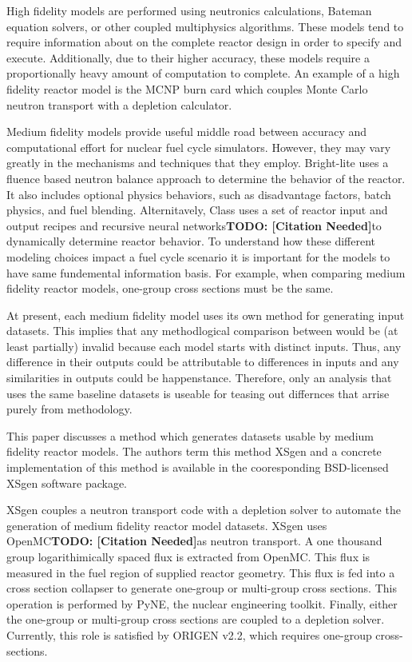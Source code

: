 \documentclass{article}
\newcommand{\TODO}[1] {{\color{red}\textbf{TODO: #1}}}
\newcommand{\citeme}{\TODO{[Citation Needed]}}
\begin{document}
High fidelity models are performed using neutronics calculations, Bateman
equation\cite{Bateman} solvers, or other coupled multiphysics algorithms. These models tend
to require information about on the complete reactor design in order to specify and execute.
Additionally, due to their higher accuracy, these models require a proportionally heavy amount
of computation to complete. An example of a high fidelity reactor model is the
MCNP\cite{mcnp5monte} burn card which couples Monte Carlo neutron transport with a depletion
calculator.

Medium fidelity models provide useful middle road between accuracy and computational effort
for nuclear fuel cycle simulators. However, they may vary greatly in the mechanisms and
techniques that they employ. Bright-lite uses a fluence based neutron balance approach to
determine the behavior of the reactor. It also includes optional physics behaviors, such as
disadvantage factors, batch physics, and fuel blending. Alternitavely, Class uses a set of
reactor input and output recipes and recursive neural networks\citeme to dynamically determine
reactor behavior. To understand how these different modeling choices impact a fuel cycle
scenario it is important for the models to have same fundemental information basis.
For example, when comparing medium fidelity reactor models, one-group cross sections
must be the same.

At present, each medium fidelity model uses its own method for generating input datasets.
This implies that any methodlogical comparison between would be (at least partially) invalid
because each model starts with distinct inputs. Thus, any difference in their outputs
could be attributable to differences in inputs and any similarities in outputs could be
happenstance. Therefore, only an analysis that uses the same baseline datasets
is useable for teasing out differnces that arrise purely from methodology.

This paper discusses a method which generates datasets usable by medium fidelity reactor models.
The authors term this method XSgen and a concrete implementation of this method is available
in the cooresponding BSD-licensed XSgen software package.

XSgen couples a neutron transport code with a depletion solver to automate the generation of
medium fidelity reactor model datasets. XSgen uses OpenMC\citeme as neutron transport.
A one thousand group logarithimically spaced flux is extracted from OpenMC. This flux is
measured in the fuel region of supplied reactor geometry. This flux is fed into a cross
section collapser to generate one-group or multi-group cross sections. This operation is
performed by PyNE\cite{pyne}, the nuclear engineering toolkit. Finally, either the
one-group or multi-group cross sections are coupled to a depletion solver. Currently, this
role is satisfied by ORIGEN v2.2\cite{origen2}, which requires one-group cross-sections.
\end{document}
